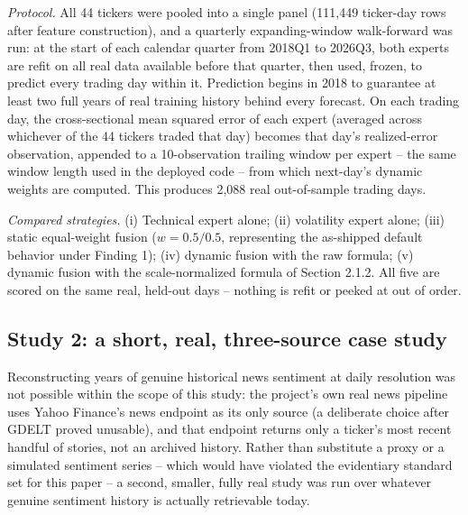 \documentclass[10pt,a4paper,twocolumn]{article}
\begin{document}
\textit{Protocol.} All 44 tickers were pooled into a single panel (111,449 ticker-day rows after feature construction), and a quarterly expanding-window walk-forward was run: at the start of each calendar quarter from 2018Q1 to 2026Q3, both experts are refit on all real data available before that quarter, then used, frozen, to predict every trading day within it. Prediction begins in 2018 to guarantee at least two full years of real training history behind every forecast. On each trading day, the cross-sectional mean squared error of each expert (averaged across whichever of the 44 tickers traded that day) becomes that day's realized-error observation, appended to a 10-observation trailing window per expert -- the same window length used in the deployed code -- from which next-day's dynamic weights are computed. This produces 2,088 real out-of-sample trading days.

\textit{Compared strategies.} (i) Technical expert alone; (ii) volatility expert alone; (iii) static equal-weight fusion ($w=0.5/0.5$, representing the as-shipped default behavior under Finding 1); (iv) dynamic fusion with the raw formula; (v) dynamic fusion with the scale-normalized formula of Section 2.1.2. All five are scored on the same real, held-out days -- nothing is refit or peeked at out of order.

\subsection{Study 2: a short, real, three-source case study}

Reconstructing years of genuine historical news sentiment at daily resolution was not possible within the scope of this study: the project's own real news pipeline uses Yahoo Finance's news endpoint as its only source (a deliberate choice after GDELT proved unusable), and that endpoint returns only a ticker's most recent handful of stories, not an archived history. Rather than substitute a proxy or a simulated sentiment series -- which would have violated the evidentiary standard set for this paper -- a second, smaller, fully real study was run over whatever genuine sentiment history is actually retrievable today.
\end{document}
